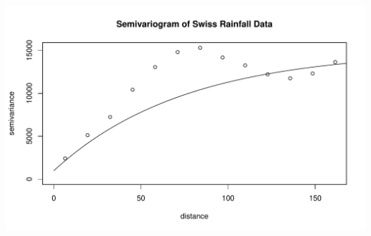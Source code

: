 \documentclass[letterpaper, 12pt]{article}\usepackage[]{graphicx}\usepackage[]{color}
\makeatletter
\def\maxwidth{ %
  \ifdim\Gin@nat@width>\linewidth
    \linewidth
  \else
    \Gin@nat@width
  \fi
}
\newenvironment{knitrout}{}{} %
\makeatother
\begin{document}
\begin{enumerate}[a.]
\begin{knitrout}
\color{fgcolor}
\includegraphics[width=\maxwidth]{figure/linefitexp} 

\end{knitrout}

\end{enumerate}
\end{document}
